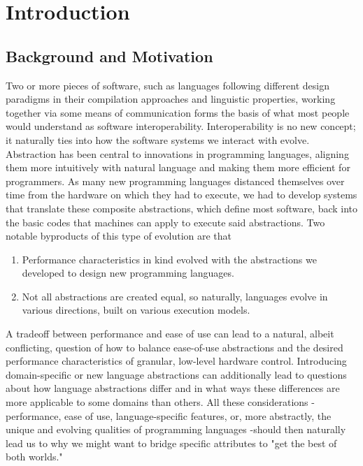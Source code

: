 \section{Introduction}\label{s:intro}

\subsection{Background and Motivation}

Two or more pieces of software, such as languages following different design paradigms in their compilation approaches and linguistic properties, working together via some means of communication forms the basis of what most people would understand as software interoperability. Interoperability is no new concept; it naturally ties into how the software systems we interact with evolve. Abstraction has been central to innovations in programming languages, aligning them more intuitively with natural language and making them more efficient for programmers. As many new programming languages distanced themselves over time from the hardware on which they had to execute, we had to develop systems that translate these composite abstractions, which define most software, back into the basic codes that machines can apply to execute said abstractions. Two notable byproducts of this type of evolution are that 
\begin{enumerate}
    \item Performance characteristics in kind evolved with the abstractions we developed to design new programming languages.
    \item Not all abstractions are created equal, so naturally, languages evolve in various directions, built on various execution models.
\end{enumerate}

A tradeoff between performance and ease of use can lead to a natural, albeit conflicting, question of how to balance ease-of-use abstractions and the desired performance characteristics of granular, low-level hardware control. Introducing domain-specific or new language abstractions can additionally lead to questions about how language abstractions differ and in what ways these differences are more applicable to some domains than others. All these considerations -performance, ease of use, language-specific features, or, more abstractly, the unique and evolving qualities of programming languages -should then naturally lead us to why we might want to bridge specific attributes to "get the best of both worlds." 

